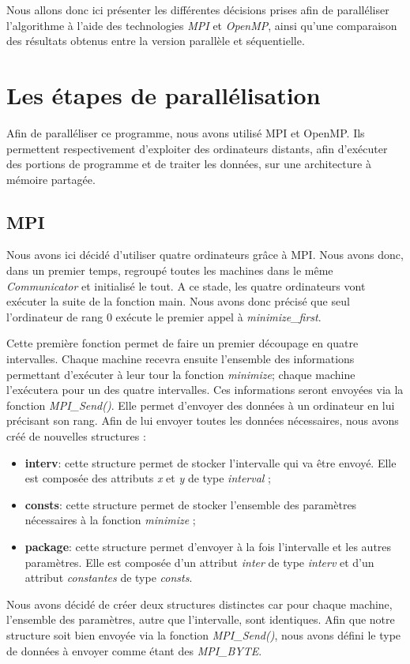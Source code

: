\documentclass[a4paper,10pt]{article}
\begin{document}
Nous allons donc ici présenter les différentes décisions prises afin de paralléliser l'algorithme à l'aide des technologies \emph{MPI} et \emph{OpenMP}, ainsi qu'une comparaison des résultats obtenus entre la version parallèle et séquentielle. 

\newpage
\section{Les étapes de parallélisation}

Afin de paralléliser ce programme, nous avons utilisé MPI et OpenMP. Ils permettent respectivement d'exploiter des ordinateurs distants, afin d'exécuter des portions de programme et de traiter les données, sur une architecture à mémoire partagée. 

\subsection{MPI}
Nous avons ici décidé d'utiliser quatre ordinateurs grâce à MPI. Nous avons donc, dans un premier temps, regroupé toutes les machines dans le même \emph{Communicator} et initialisé le tout. A ce stade, les quatre ordinateurs vont exécuter la suite de la fonction main. Nous avons donc précisé que seul l'ordinateur de rang 0 exécute le premier appel à \emph{minimize\_first}. 

Cette première fonction permet de faire un premier découpage en quatre intervalles. Chaque machine recevra ensuite l'ensemble des informations permettant d'exécuter à leur tour la fonction \emph{minimize}; chaque machine l'exécutera pour un des quatre intervalles. Ces informations seront envoyées via la fonction \emph{MPI\_Send()}. Elle permet d'envoyer des données à un ordinateur en lui précisant son rang. Afin de lui envoyer toutes les données nécessaires, nous avons créé de nouvelles structures : 
\begin{itemize}
\item \textbf{interv}: cette structure permet de stocker l'intervalle qui va être envoyé. Elle est composée des attributs \emph{x} et \emph{y} de type \emph{interval} ; 
\item \textbf{consts}: cette structure permet de stocker l'ensemble des paramètres nécessaires à la fonction \emph{minimize} ; 
\item \textbf{package}: cette structure permet d'envoyer à la fois l'intervalle et les autres paramètres. Elle est composée d'un attribut \emph{inter} de type \emph{interv} et d'un attribut \emph{constantes} de type \emph{consts}. 
\end{itemize}
Nous avons décidé de créer deux structures distinctes car pour chaque machine, l'ensemble des paramètres, autre que l'intervalle, sont identiques.
Afin que notre structure soit bien envoyée via la fonction \emph{MPI\_Send()}, nous avons défini le type de données à envoyer comme étant des \emph{MPI\_BYTE}.
\end{document}
